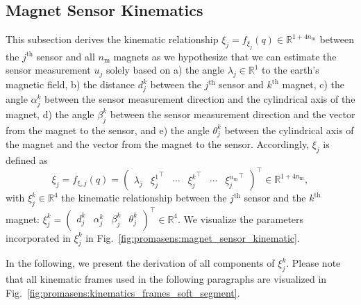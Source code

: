 \subsection{Magnet Sensor Kinematics}\label{sub:promasens:kinematic_model_magnet_sensor_kinematics}
This subsection derives the kinematic relationship $\xi_j = f_{\xi_j}(q) \in \mathbb{R}^{1+4n_\mathrm{m}}$ between the $j^\mathrm{th}$ sensor and all $n_\mathrm{m}$ magnets as we hypothesize that we can estimate the sensor measurement $u_j$ solely based on
a) the angle $\lambda_j \in \mathbb{R}^1$ to the earth's magnetic field,
b) the distance $d_j^k$  between the $j^\mathrm{th}$ sensor and $k^\mathrm{th}$ magnet,
c) the angle $\alpha_j^k$ between the sensor measurement direction and the cylindrical axis of the magnet,
d) the angle $\beta_j^k$ between the sensor measurement direction and the vector from the magnet to the sensor,
and e) the angle $\theta_j^k$ between the cylindrical axis of the magnet and the vector from the magnet to the sensor.
Accordingly, $\xi_j$ is defined as
\begin{equation}
    \xi_{j} = f_{\mathrm{\xi},j}(q) =
    \begin{pmatrix}
        \lambda_{j} & {\xi_{j}^1}^\top & \cdots & {\xi_{j}^k}^\top & \cdots & {\xi_{j}^{n_\mathrm{m}}}^\top
    \end{pmatrix}^\top \in \mathbb{R}^{1 + 4n_\mathrm{m}},
\end{equation}
with $\xi_j^{k} \in \mathbb{R}^4$ the kinematic relationship between the $j^\mathrm{th}$ sensor and the $k^\mathrm{th}$ magnet: $\xi_j^{k} = \begin{pmatrix} d_j^k & \alpha_j^k & \beta_j^k & \theta_j^k \end{pmatrix}^\top \in \mathbb{R}^4$. We visualize the parameters incorporated in $\xi_j^{k}$ in Fig.~\ref{fig:promasens:magnet_sensor_kinematic}.

In the following, we present the derivation of all components of $\xi_j^{k}$. 
Please note that all kinematic frames used in the following paragraphs are visualized in Fig.~\ref{fig:promasens:kinematics_frames_soft_segment}.

